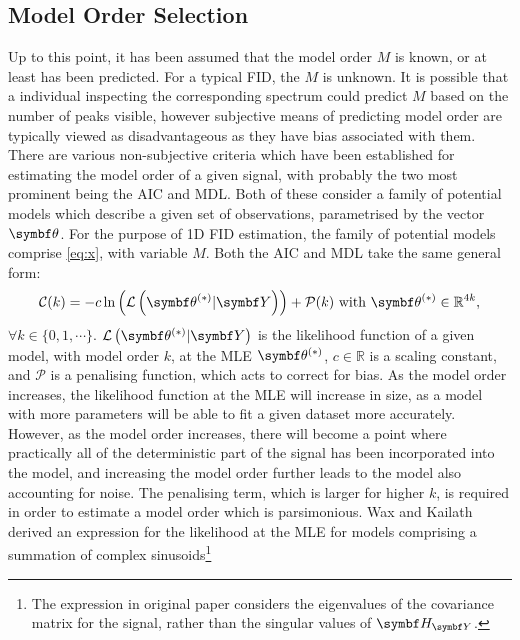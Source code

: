 {\subsection{Model Order Selection}
\label{subsec:model-order}
Up to this point, it has been assumed that the model order $M$ is known, or at
least has been predicted. For a typical \ac{FID}, the $M$ is unknown. It is
possible that a individual inspecting the corresponding spectrum could predict
$M$ based on the number of peaks visible, however subjective means of predicting
model order are typically viewed as disadvantageous as they have bias
associated with them.
There are various non-subjective criteria which have been established for
estimating the model order of a given signal, with probably the two most
prominent being the \ac{AIC}\cite{Akaike1974} and
\ac{MDL}\cite{Schwarz1978,Rissanen1978}. Both of these consider a family of
potential models which describe a given set of observations, parametrised by
the vector $\bth$. For the purpose of \ac{1D} \ac{FID} estimation, the family
of potential models comprise \eqref{eq:x}, with variable $M$. Both the \ac{AIC}
and \ac{MDL} take the same general form:
\begin{equation}
    \mathcal{C}(k) = -c \ln \left(\mathcal{L} \left(\bthstar | \bY \right)
    \right) + \mathcal{P}(k) \text{ with } \bthstar \in \mathbb{R}^{4k},
\end{equation}
$\forall k \in \lbrace 0, 1, \cdots \rbrace$. $\mathcal{L} \left(\bthstar |
\bY \right)$ is the likelihood
function of a given model, with model order $k$, at the \ac{MLE}
$\bthstar$, $c \in \mathbb{R}$ is a scaling
constant, and $\mathcal{P}$ is a penalising function, which acts to correct
for bias. As the model order increases, the likelihood function at the \ac{MLE}
will increase in size, as a model with more parameters will be able to fit a
given dataset more accurately. However, as the model order increases, there will
become a point where practically all of the deterministic part of the signal
has been incorporated into the model, and increasing the model order further
leads to the model also accounting for noise. The penalising term, which
is larger for higher $k$, is required in order to estimate a model
order which is parsimonious. Wax and Kailath derived an expression for
the likelihood at the \ac{MLE} for models comprising a summation of
complex sinusoids\cite{Wax1985}\footnote{
    The expression in original paper considers the eigenvalues of the
    covariance matrix for the signal, rather than the singular values of $\HY$.
}}
